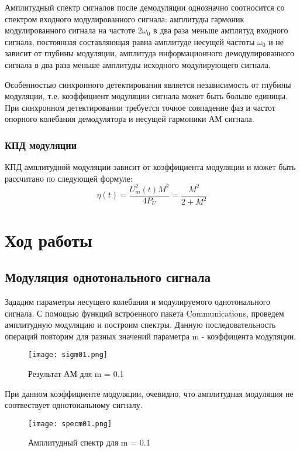 Амплитудный спектр сигналов после демодуляции однозначно соотносится со спектром входного модулированного сигнала: 
амплитуды гармоник модулированного сигнала на частоте 2$\omega_0$ в два раза меньше амплитуд входного сигнала,
 постоянная составляющая равна амплитуде несущей частоты $\omega_0$ и не зависит от глубины модуляции, амплитуда
  информационного демодулированного сигнала в два раза меньше амплитуды исходного модулирующего сигнала. 

Особенностью синхронного детектирования является независимость от глубины модуляции,
 т.е. коэффициент модуляции сигнала может быть больше единицы. 
 При синхронном детектировании требуется точное совпадение фаз и частот 
 опорного колебания демодулятора и несущей гармоники АМ сигнала.

\subsubsection{КПД модуляции}
КПД амплитудной модуляции зависит от коэффициента модуляции и может быть рассчитано по следующей формуле:
 \begin{equation}\label{eq05}
	\eta (t) =\frac{ U_m^2(t) M^2}{4 P_U}  = \frac{M^2}{2 + M^2} 
\end{equation}


\section{Ход работы}

\subsection{Модуляция однотонального сигнала}
Зададим параметры несущего колебания и модулируемого однотонального сигнала.
С помощью функций встроенного пакета Communications, проведем амплитудную модуляцию и построим спектры. Данную последовательность операций повторим для разных значений параметра m - коэффицента модуляции.

\begin{figure}[H]
	\begin{center}
		\texttt{[image: sigm01.png]}
		\caption{Результат АМ для m = 0.1} 
		\label{pic:pic01} %
	\end{center}
\end{figure} 
При данном коэффициенте модуляции, очевидно, что амплитудная модуляция не соотвествует однотональному сигналу.  
\begin{figure}[H]
	\begin{center}
		\texttt{[image: specm01.png]}
		\caption{Амплитудный спектр для m = 0.1} 
		\label{pic:pic02} %
	\end{center}
\end{figure} 


